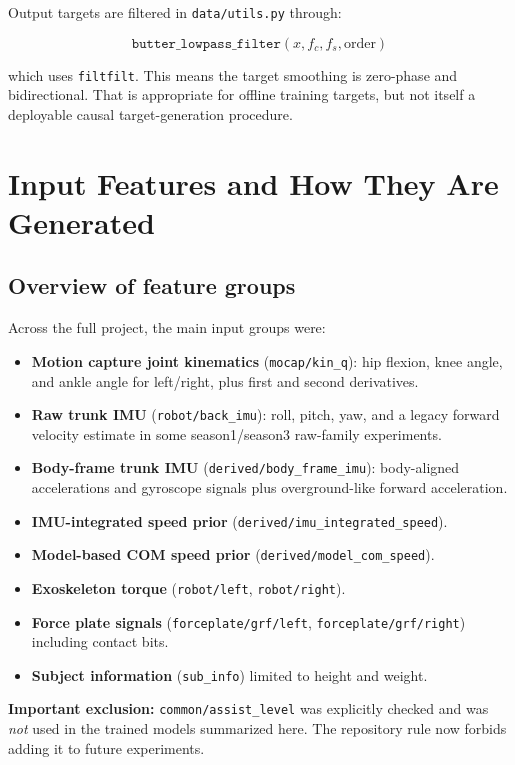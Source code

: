 \documentclass[11pt,a4paper]{article}
\begin{document}
Output targets are filtered in \texttt{data/utils.py} through:

\[
\texttt{butter\_lowpass\_filter}(x, f_c, f_s, \text{order})
\]

which uses \texttt{filtfilt}. This means the target smoothing is zero-phase and bidirectional. That is appropriate for offline training targets, but not itself a deployable causal target-generation procedure.

\section{Input Features and How They Are Generated}

\subsection{Overview of feature groups}

Across the full project, the main input groups were:

\begin{itemize}
\item \textbf{Motion capture joint kinematics} (\texttt{mocap/kin\_q}):
  hip flexion, knee angle, and ankle angle for left/right, plus first and second derivatives.
\item \textbf{Raw trunk IMU} (\texttt{robot/back\_imu}):
  roll, pitch, yaw, and a legacy forward velocity estimate in some season1/season3 raw-family experiments.
\item \textbf{Body-frame trunk IMU} (\texttt{derived/body\_frame\_imu}):
  body-aligned accelerations and gyroscope signals plus overground-like forward acceleration.
\item \textbf{IMU-integrated speed prior} (\texttt{derived/imu\_integrated\_speed}).
\item \textbf{Model-based COM speed prior} (\texttt{derived/model\_com\_speed}).
\item \textbf{Exoskeleton torque} (\texttt{robot/left}, \texttt{robot/right}).
\item \textbf{Force plate signals} (\texttt{forceplate/grf/left}, \texttt{forceplate/grf/right}) including contact bits.
\item \textbf{Subject information} (\texttt{sub\_info}) limited to height and weight.
\end{itemize}

\textbf{Important exclusion:} \texttt{common/assist\_level} was explicitly checked and was \emph{not} used in the trained models summarized here. The repository rule now forbids adding it to future experiments.
\end{document}
